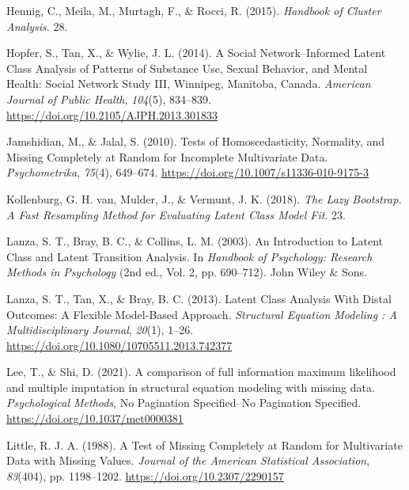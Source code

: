 \documentclass[
  ,man,floatsintext]{apa6}
\newlength{\cslhangindent}
\newlength{\cslentryspacingunit} %
\newenvironment{CSLReferences}[2] %
 {%
  \setlength{\parindent}{0pt}
  \ifodd #1
  \let\oldpar\par
  \def\par{\hangindent=\cslhangindent\oldpar}
  \fi
  \setlength{\parskip}{#2\cslentryspacingunit}
 }%
 {}
\begin{document}
\begin{CSLReferences}{1}{0}
\leavevmode{}%
Hennig, C., Meila, M., Murtagh, F., \& Rocci, R. (2015). \emph{Handbook of {Cluster} {Analysis}}. 28.

\leavevmode{}%
Hopfer, S., Tan, X., \& Wylie, J. L. (2014). A {Social} {Network}--{Informed} {Latent} {Class} {Analysis} of {Patterns} of {Substance} {Use}, {Sexual} {Behavior}, and {Mental} {Health}: {Social} {Network} {Study} {III}, {Winnipeg}, {Manitoba}, {Canada}. \emph{American Journal of Public Health}, \emph{104}(5), 834--839. \url{https://doi.org/10.2105/AJPH.2013.301833}

\leavevmode{}%
Jamshidian, M., \& Jalal, S. (2010). Tests of {Homoscedasticity}, {Normality}, and {Missing} {Completely} at {Random} for {Incomplete} {Multivariate} {Data}. \emph{Psychometrika}, \emph{75}(4), 649--674. \url{https://doi.org/10.1007/s11336-010-9175-3}

\leavevmode{}%
Kollenburg, G. H. van, Mulder, J., \& Vermunt, J. K. (2018). \emph{The {Lazy} {Bootstrap}. {A} {Fast} {Resampling} {Method} for {Evaluating} {Latent} {Class} {Model} {Fit}}. 23.

\leavevmode{}%
Lanza, S. T., Bray, B. C., \& Collins, L. M. (2003). An {Introduction} to {Latent} {Class} and {Latent} {Transition} {Analysis}. In \emph{Handbook of {Psychology}: {Research} {Methods} in {Psychology}} (2nd ed., Vol. 2, pp. 690--712). John Wiley \& Sons.

\leavevmode{}%
Lanza, S. T., Tan, X., \& Bray, B. C. (2013). Latent {Class} {Analysis} {With} {Distal} {Outcomes}: {A} {Flexible} {Model}-{Based} {Approach}. \emph{Structural Equation Modeling : A Multidisciplinary Journal}, \emph{20}(1), 1--26. \url{https://doi.org/10.1080/10705511.2013.742377}

\leavevmode{}%
Lee, T., \& Shi, D. (2021). A comparison of full information maximum likelihood and multiple imputation in structural equation modeling with missing data. \emph{Psychological Methods}, No Pagination Specified--No Pagination Specified. \url{https://doi.org/10.1037/met0000381}

\leavevmode{}%
Little, R. J. A. (1988). A {Test} of {Missing} {Completely} at {Random} for {Multivariate} {Data} with {Missing} {Values}. \emph{Journal of the American Statistical Association}, \emph{83}(404), pp. 1198--1202. \url{https://doi.org/10.2307/2290157}


\end{CSLReferences}
\end{document}

